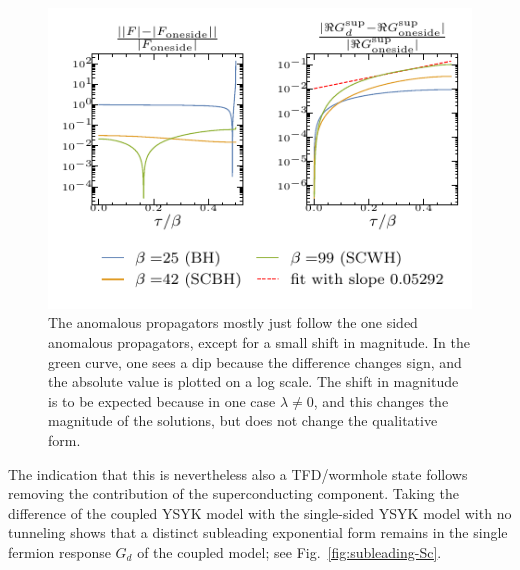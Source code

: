 \begin{figure}
    \centering
    \includegraphics[width=0.9\linewidth]{figures/chapter3/ratioFsv2.pdf} %
    \caption{The anomalous propagators mostly just follow the one sided anomalous propagators, except for a small shift in magnitude. In the green curve, one sees a dip because the difference changes sign, and the absolute value is plotted on a log scale. The shift in magnitude is to be expected because in one case $\lambda \neq 0$, and this changes the magnitude of the solutions, but does not change the qualitative form.}
    \label{fig:Fratio}
\end{figure}
The indication that this is nevertheless also a TFD/wormhole state follows removing the contribution of the superconducting component. Taking the difference of the coupled YSYK model with the single-sided YSYK model with no tunneling shows that a distinct subleading exponential form remains in the single fermion response $G_d$ of the coupled model; see Fig.~\ref{fig:subleading-Sc}.

